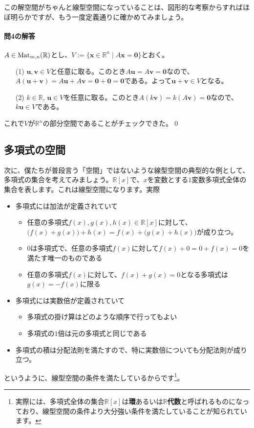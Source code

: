 この解空間がちゃんと線型空間になっていることは、図形的な考察からすればほぼ明らかですが、もう一度定義通りに確かめてみましょう。

\paragraph{問4の解答}

$A \in \operatorname{Mat}_{m,n}(\mathbb{R})$とし、$V:=\{\bm{x}\in\mathbb{R}^n \mid A\bm{x} = \bm{0} \}$とおく。
\begin{itemize}
\item[(1)] $\bm{u}, \bm{v}\in V$と任意に取る。このとき$A\bm{u} = A\bm{v} = \bm{0}$なので、$A(\bm{u} + \bm{v}) = A\bm{u} + A\bm{v} = \bm{0} + \bm{0} = \bm{0}$である。よって$\bm{u} + \bm{v} \in V$となる。
\item[(2)] $k\in\mathbb{R}$, $\bm{u}\in V$を任意に取る。このとき$A (k\bm{v}) = k (A\bm{v}) = \bm{0}$なので、$k\bm{u}\in V$である。
\end{itemize}

これで$V$が$\mathbb{R}^n$の部分空間であることがチェックできた。\qed

\subsection{多項式の空間}

次に、僕たちが普段言う「空間」ではないような線型空間の典型的な例として、多項式の集合を考えてみましょう。$\mathbb{R}[x]$で、$x$を変数とする$1$変数多項式全体の集合を表します。これは線型空間になります。実際
\begin{itemize}
\item 多項式には加法が定義されていて
\begin{itemize}
\item 任意の多項式$f(x), g(x), h(x)\in\mathbb{R}[x]$に対して、$\bigl(f(x) + g(x)\bigr) + h(x) = f(x) + \bigl(g(x) + h(x)\bigr)$が成り立つ。
\item $0$は多項式で、任意の多項式$f(x)$に対して$f(x) + 0 = 0 + f(x) = 0$を満たす唯一のものである
\item 任意の多項式$f(x)$に対して、$f(x) + g(x) = 0$となる多項式は$g(x) = -f(x)$に限る
\end{itemize}
\item 多項式には実数倍が定義されていて
\begin{itemize}
\item 多項式の掛け算はどのような順序で行ってもよい
\item 多項式の$1$倍は元の多項式と同じである
\end{itemize}
\item 多項式の積は分配法則を満たすので、特に実数倍についても分配法則が成り立つ。
\end{itemize}
というように、線型空間の条件を満たしているからです\footnote{実際には、多項式全体の集合$\mathbb{R}[x]$は\textbf{環}あるいは\textbf{$\mathbb{R}$代数}と呼ばれるものになっており、線型空間の条件より大分強い条件を満たしていることが知られています。}。

